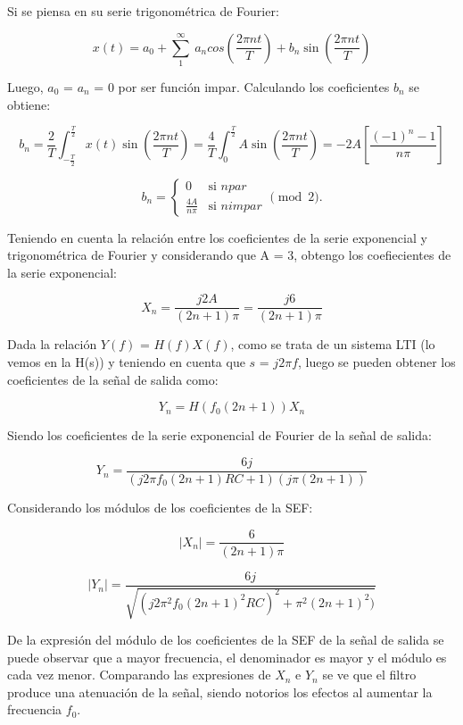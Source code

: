 Si se piensa en su serie trigonométrica de Fourier:

$$ x(t)=a_{0}+\sum_{1}^{\infty}\ a_{n}cos(\frac{2\pi nt}{T}) +b_{n}\sin(\frac{2\pi nt}{T}) $$

Luego, $a_0$ = $a_n$ = 0 por ser función impar. Calculando los coeficientes $b_n$ se obtiene:

$$b_{n} =\frac{2}{T}\int_{-\frac{T}{2}}^{\frac{T}{2}}x(t)\sin (\frac{2\pi nt}{T}) = \frac{4}{T}\int_{0}^{\frac{T}{2}}A\sin (\frac{2\pi nt}{T})=-2A\left [ \frac{\left ( -1 \right )^{n}-1}{n\pi } \right ]$$


$$ b_{n} = \begin{cases} 0 &\mbox{si } n par\\
    \frac{4A}{n\pi} & \mbox{si } n impar\end{cases} \pmod{2}. $$


Teniendo en cuenta la relación entre los coeficientes de la serie exponencial y trigonométrica de Fourier y considerando que A = 3, obtengo los coefiecientes de la serie exponencial:

$$ X_{n}=\frac{j2A}{(2n+1)\pi } = \frac{j6}{(2n+1)\pi } $$

Dada la relación $Y(f)$ = $H(f)X(f)$, como se trata de un sistema LTI (lo vemos en la H(s)) y teniendo en cuenta que $s$ = $j2\pi$$f$, luego se pueden obtener los coeficientes de la señal de salida como:

$$Y_{n} = H(f_{0}(2n+1))X_{n}$$

Siendo los coeficientes de la serie exponencial de Fourier de la señal de salida:

$$Y_{n} = \frac{6j}{(j2\pi f_{0}(2n+1)RC +1) (j\pi (2n+1))}$$

Considerando los módulos de los coeficientes de la SEF:

$$\left | X_{n} \right | = \frac{6}{(2n+1)\pi }$$

$$\left | Y_{n} \right | = \frac{6j}{\sqrt{(j2\pi^{2} f_{0}(2n+1)^{2}RC)^{2} +\pi^{2}(2n+1)^{2})}}$$

De la expresión del módulo de los coeficientes de la SEF de la señal de salida se puede observar que a mayor frecuencia, el denominador es mayor y el módulo es cada vez menor. Comparando las expresiones de $X_n$ e $Y_n$ se ve que el filtro produce una atenuación de la señal, siendo notorios los efectos al aumentar la frecuencia $f_0$.

